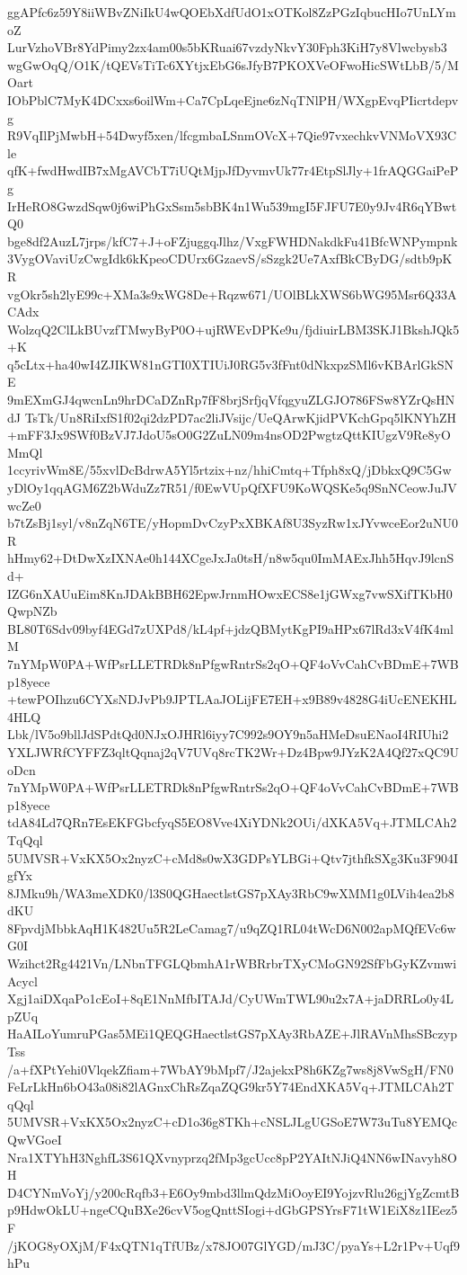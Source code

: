 ggAPfc6z59Y8iiWBvZNiIkU4wQOEbXdfUdO1xOTKol8ZzPGzIqbucHIo7UnLYmoZ
LurVzhoVBr8YdPimy2zx4am00s5bKRuai67vzdyNkvY30Fph3KiH7y8Vlwcbysb3
wgGwOqQ/O1K/tQEVsTiTc6XYtjxEbG6sJfyB7PKOXVeOFwoHicSWtLbB/5/MOart
IObPblC7MyK4DCxxs6oilWm+Ca7CpLqeEjne6zNqTNlPH/WXgpEvqPIicrtdepvg
R9VqIlPjMwbH+54Dwyf5xen/lfcgmbaLSnmOVcX+7Qie97vxechkvVNMoVX93Cle
qfK+fwdHwdIB7xMgAVCbT7iUQtMjpJfDyvmvUk77r4EtpSlJly+1frAQGGaiPePg
IrHeRO8GwzdSqw0j6wiPhGxSsm5sbBK4n1Wu539mgI5FJFU7E0y9Jv4R6qYBwtQ0
bge8df2AuzL7jrps/kfC7+J+oFZjuggqJlhz/VxgFWHDNakdkFu41BfcWNPympnk
3VygOVaviUzCwgIdk6kKpeoCDUrx6GzaevS/sSzgk2Ue7AxfBkCByDG/sdtb9pKR
vgOkr5sh2lyE99c+XMa3s9xWG8De+Rqzw671/UOlBLkXWS6bWG95Msr6Q33ACAdx
WolzqQ2ClLkBUvzfTMwyByP0O+ujRWEvDPKe9u/fjdiuirLBM3SKJ1BkshJQk5+K
q5cLtx+ha40wI4ZJIKW81nGTI0XTIUiJ0RG5v3fFnt0dNkxpzSMl6vKBArlGkSNE
9mEXmGJ4qwcnLn9hrDCaDZnRp7fF8brjSrfjqVfqgyuZLGJO786FSw8YZrQsHNdJ
TsTk/Un8RiIxfS1f02qi2dzPD7ac2liJVsijc/UeQArwKjidPVKchGpq5lKNYhZH
+mFF3Jx9SWf0BzVJ7JdoU5sO0G2ZuLN09m4nsOD2PwgtzQttKIUgzV9Re8yOMmQl
1ccyrivWm8E/55xvlDcBdrwA5Yl5rtzix+nz/hhiCmtq+Tfph8xQ/jDbkxQ9C5Gw
yDlOy1qqAGM6Z2bWduZz7R51/f0EwVUpQfXFU9KoWQSKe5q9SnNCeowJuJVwcZe0
b7tZsBj1syl/v8nZqN6TE/yHopmDvCzyPxXBKAf8U3SyzRw1xJYvwceEor2uNU0R
hHmy62+DtDwXzIXNAe0h144XCgeJxJa0tsH/n8w5qu0ImMAExJhh5HqvJ9lcnSd+
IZG6nXAUuEim8KnJDAkBBH62EpwJrnmHOwxECS8e1jGWxg7vwSXifTKbH0QwpNZb
BL80T6Sdv09byf4EGd7zUXPd8/kL4pf+jdzQBMytKgPI9aHPx67lRd3xV4fK4mlM
7nYMpW0PA+WfPsrLLETRDk8nPfgwRntrSs2qO+QF4oVvCahCvBDmE+7WBp18yece
+tewPOIhzu6CYXsNDJvPb9JPTLAaJOLijFE7EH+x9B89v4828G4iUcENEKHL4HLQ
Lbk/lV5o9bllJdSPdtQd0NJxOJHRl6iyy7C992s9OY9n5aHMeDsuENaoI4RIUhi2
YXLJWRfCYFFZ3qltQqnaj2qV7UVq8rcTK2Wr+Dz4Bpw9JYzK2A4Qf27xQC9UoDcn
7nYMpW0PA+WfPsrLLETRDk8nPfgwRntrSs2qO+QF4oVvCahCvBDmE+7WBp18yece
tdA84Ld7QRn7EsEKFGbcfyqS5EO8Vve4XiYDNk2OUi/dXKA5Vq+JTMLCAh2TqQql
5UMVSR+VxKX5Ox2nyzC+cMd8s0wX3GDPsYLBGi+Qtv7jthfkSXg3Ku3F904IgfYx
8JMku9h/WA3meXDK0/l3S0QGHaectlstGS7pXAy3RbC9wXMM1g0LVih4ea2b8dKU
8FpvdjMbbkAqH1K482Uu5R2LeCamag7/u9qZQ1RL04tWcD6N002apMQfEVc6wG0I
Wzihct2Rg4421Vn/LNbnTFGLQbmhA1rWBRrbrTXyCMoGN92SfFbGyKZvmwiAcycl
Xgj1aiDXqaPo1cEoI+8qE1NnMfbITAJd/CyUWmTWL90u2x7A+jaDRRLo0y4LpZUq
HaAILoYumruPGas5MEi1QEQGHaectlstGS7pXAy3RbAZE+JlRAVnMhsSBczypTss
/a+fXPtYehi0VlqekZfiam+7WbAY9bMpf7/J2ajekxP8h6KZg7ws8j8VwSgH/FN0
FeLrLkHn6bO43a08i82lAGnxChRsZqaZQG9kr5Y74EndXKA5Vq+JTMLCAh2TqQql
5UMVSR+VxKX5Ox2nyzC+cD1o36g8TKh+cNSLJLgUGSoE7W73uTu8YEMQcQwVGoeI
Nra1XTYhH3NghfL3S61QXvnyprzq2fMp3gcUcc8pP2YAItNJiQ4NN6wINavyh8OH
D4CYNmVoYj/y200cRqfb3+E6Oy9mbd3llmQdzMiOoyEI9YojzvRlu26gjYgZcmtB
p9HdwOkLU+ngeCQuBXe26cvV5ogQnttSIogi+dGbGPSYrsF71tW1EiX8z1IEez5F
/jKOG8yOXjM/F4xQTN1qTfUBz/x78JO07GlYGD/mJ3C/pyaYs+L2r1Pv+Uqf9hPu

